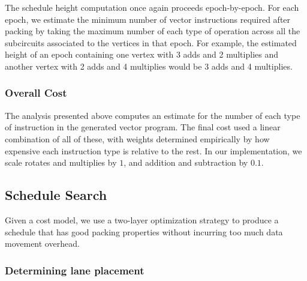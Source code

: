 The schedule height computation once again proceeds epoch-by-epoch.
For each epoch, we estimate the minimum number of vector instructions required after packing by taking the maximum number of each type of operation across all the subcircuits associated to the vertices in that epoch.
For example, the estimated height of an epoch containing one vertex with 3 adds and 2 multiplies and another vertex with 2 adds and 4 multiplies would be 3 adds and 4 multiplies.

\subsubsection*{Overall Cost}
The analysis presented above computes an estimate for the number of each type of instruction in the generated vector program.
The final cost used a linear combination of all of these, with weights determined empirically by how expensive each instruction type is relative to the rest.
In our implementation, we scale rotates and multiplies by $1$, and addition and subtraction by $0.1$. 

\subsection{Schedule Search}\label{sec:schedule-search}
Given a cost model, we use a two-layer optimization strategy to produce a schedule that has good packing properties without incurring too much data movement overhead.
\subsubsection*{Determining lane placement}
    

